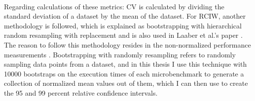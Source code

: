 \documentclass{seal_thesis}
\begin{document}
\\
Regarding calculations of these metrics: CV is calculated by dividing the standard deviation of a dataset by the mean of the dataset. For RCIW, another methodology is followed, which is explained as bootstrapping with hierarchical random resampling with replacement and is also used in Laaber et al.'s paper \cite{laaber2019software}\cite{davison_hinkley_1997}\cite{hierach_data_2010} . The reason to follow this methodology resides in the non-normalized performance measurements \cite{laaber2019software}. Bootstrapping with randomly resampling refers to randomly sampling data points from a dataset, and in this thesis I use this technique with 10000 bootstraps on the execution times of each microbenchmark to generate a collection of normalized mean values out of them, which I can then use to create the 95 and 99 percent relative confidence intervals.
\end{document}
